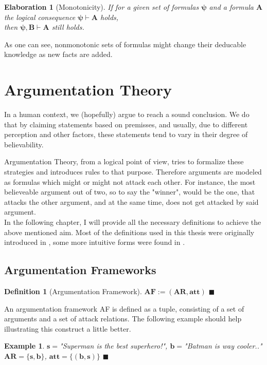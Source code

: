 \documentclass[12pt]{report}
\numberwithin{figure}{chapter}
\theoremstyle{break}
\newtheorem{defn}{Definition}[chapter]
\newtheorem{exmpl}{Example}[chapter]
\newtheorem{elab}{Elaboration}[chapter]
\newenvironment{mydefn}{\begin{defn}}{$\blacksquare$ \end{defn}}
\newenvironment{myexmpl}{\begin{exmpl}}{$\blacksquare$ \end{exmpl}}
\begin{document}
\begin{elab}[Monotonicity]
If for a given set of formulas $\bm{\psi}$ and a formula $\bm{A}$ the logical consequence $\bm{\psi \vdash A}$ holds,\\ then $\bm{\psi,B \vdash A}$ still holds.
\end{elab}
As one can see, nonmonotonic sets of formulas might change their deducable knowledge as new facts are added. 

\section{Argumentation Theory}
In a human context, we (hopefully) argue to reach a sound conclusion. We do that by claiming statements based on premisses, and usually, due to different perception and other factors,
these statements tend to vary in their degree of believability.

Argumentation Theory, from a logical point of view, tries to formalize these strategies and introduces rules to that purpose. 
Therefore arguments are modeled as formulas which might or might not attack each other.
For instance, the most believeable argument out of two, so to say the "winner", 
would be the one, that attacks the other argument, and at the same time, does not get attacked by said argument.\\
In the following chapter, I will provide all the necessary definitions to achieve the above mentioned aim.
Most of the definitions used in this thesis were originally introduced in \cite{Dung}, some more intuitive forms were found in \cite{Egly}.

\newpage	

\subsection{Argumentation Frameworks}
\begin{mydefn}[Argumentation Framework]
$\bm{AF:=(AR,att)}$
\end{mydefn}

An argumentation framework AF is defined as a tuple, consisting of a set of arguments and a set of attack relations.
The following example should help illustrating this construct a little better.

\begin{myexmpl}
$\bm{s=}$"Superman is the best superhero!", $\bm{b=}$"Batman is way cooler.."\\
$\bm{AR = \{s,b\}}$, $\bm{att=\{(b,s)\}}$
\end{myexmpl}
\end{document}
